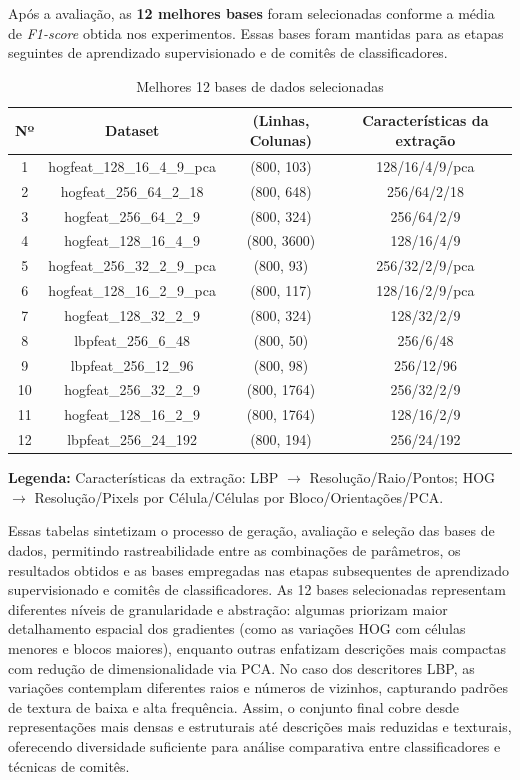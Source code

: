 \documentclass[12pt]{article}
\begin{document}
Após a avaliação, as \textbf{12 melhores bases} foram selecionadas conforme a média de \textit{F1-score} obtida nos experimentos. Essas bases foram mantidas para as etapas seguintes de aprendizado supervisionado e de comitês de classificadores.

\begin{table}[H]
\centering
\caption{Melhores 12 bases de dados selecionadas}
\label{tab:bases_selecionadas}
\begin{tabular}{cccc}
\toprule
\textbf{Nº} & \textbf{Dataset} & \textbf{(Linhas, Colunas)} & \textbf{Características da extração} \\
\midrule
1  & hogfeat\_128\_16\_4\_9\_pca & (800, 103)   & 128/16/4/9/pca \\
2  & hogfeat\_256\_64\_2\_18     & (800, 648)   & 256/64/2/18 \\
3  & hogfeat\_256\_64\_2\_9      & (800, 324)   & 256/64/2/9 \\
4  & hogfeat\_128\_16\_4\_9      & (800, 3600)  & 128/16/4/9 \\
5  & hogfeat\_256\_32\_2\_9\_pca & (800, 93)    & 256/32/2/9/pca \\
6  & hogfeat\_128\_16\_2\_9\_pca & (800, 117)   & 128/16/2/9/pca \\
7  & hogfeat\_128\_32\_2\_9      & (800, 324)   & 128/32/2/9 \\
8  & lbpfeat\_256\_6\_48         & (800, 50)    & 256/6/48 \\
9  & lbpfeat\_256\_12\_96        & (800, 98)    & 256/12/96 \\
10 & hogfeat\_256\_32\_2\_9      & (800, 1764)  & 256/32/2/9 \\
11 & hogfeat\_128\_16\_2\_9      & (800, 1764)  & 128/16/2/9 \\
12 & lbpfeat\_256\_24\_192       & (800, 194)   & 256/24/192 \\
\bottomrule
\end{tabular}

\vspace{0.5em}
\footnotesize
\textbf{Legenda:}  
Características da extração: LBP $\rightarrow$ Resolução/Raio/Pontos;  
HOG $\rightarrow$ Resolução/Pixels por Célula/Células por Bloco/Orientações/PCA.
\end{table}


Essas tabelas sintetizam o processo de geração, avaliação e seleção das bases de dados, permitindo rastreabilidade entre as combinações de parâmetros, os resultados obtidos e as bases empregadas nas etapas subsequentes de aprendizado supervisionado e comitês de classificadores. As 12 bases selecionadas representam diferentes níveis de granularidade e abstração: algumas priorizam maior detalhamento espacial dos gradientes (como as variações HOG com células menores e blocos maiores), enquanto outras enfatizam descrições mais compactas com redução de dimensionalidade via PCA. No caso dos descritores LBP, as variações contemplam diferentes raios e números de vizinhos, capturando padrões de textura de baixa e alta frequência. Assim, o conjunto final cobre desde representações mais densas e estruturais até descrições mais reduzidas e texturais, oferecendo diversidade suficiente para análise comparativa entre classificadores e técnicas de comitês.
\end{document}
